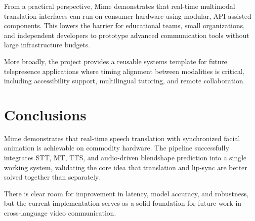 From a practical perspective, Mime demonstrates that real-time multimodal translation interfaces can run on consumer hardware using modular, API-assisted components. This lowers the barrier for educational teams, small organizations, and independent developers to prototype advanced communication tools without large infrastructure budgets.

More broadly, the project provides a reusable systems template for future telepresence applications where timing alignment between modalities is critical, including accessibility support, multilingual tutoring, and remote collaboration.

\section{Conclusions}

Mime demonstrates that real-time speech translation with synchronized facial animation is achievable on commodity hardware. The pipeline successfully integrates STT, MT, TTS, and audio-driven blendshape prediction into a single working system, validating the core idea that translation and lip-sync are better solved together than separately.

There is clear room for improvement in latency, model accuracy, and robustness, but the current implementation serves as a solid foundation for future work in cross-language video communication.